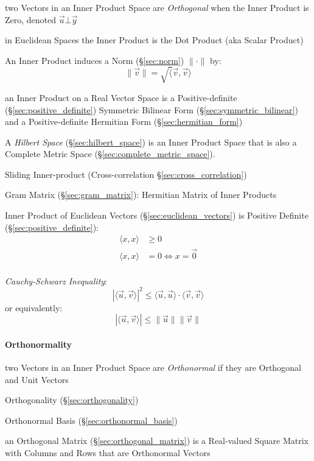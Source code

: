 two Vectors in an Inner Product Space are \emph{Orthogonal} when the Inner
Product is Zero, denoted $\vec{u} \bot \vec{y}$

in Euclidean Spaces the Inner Product is the Dot Product (aka Scalar Product)

An Inner Product induces a Norm (\S\ref{sec:norm}) $\|\cdot\|$ by:
\[
  \|\vec{v}\| = \sqrt\langle{\vec{v},\vec{v}}\rangle
\]

an Inner Product on a Real Vector Space is a Positive-definite
(\S\ref{sec:positive_definite}) Symmetric Bilinear Form
(\S\ref{sec:symmetric_bilinear}) and a Positive-definite Hermitian Form
(\S\ref{sec:hermitian_form})

A \emph{Hilbert Space} (\S\ref{sec:hilbert_space}) is an Inner Product Space
that is also a Complete Metric Space (\S\ref{sec:complete_metric_space}).

\fist Sliding Inner-product (Cross-correlation \S\ref{sec:cross_correlation})

\fist Gram Matrix (\S\ref{sec:gram_matrix}): Hermitian Matrix of Inner
Products

Inner Product of Euclidean Vectors (\S\ref{sec:euclidean_vectors}) is Positive
Definite (\S\ref{sec:positive_definite}):
\begin{align*}
  \langle{x,x}\rangle & \geq 0 \\
  \langle{x,x}\rangle & =    0 \Leftrightarrow x = \vec{0} \\
\end{align*}

\emph{Cauchy-Schwarz Inequality}:
\[
  |\langle{\vec{u},\vec{v}}\rangle|^2 \leq
    \langle{\vec{u},\vec{u}}\rangle \cdot \langle{\vec{v},\vec{v}}\rangle
\]
or equivalently:
\[
  |\langle{\vec{u},\vec{v}}\rangle| \leq \|\vec{u}\| \|\vec{v}\|
\]



\paragraph{Orthonormality}\label{sec:orthonormality}\hfill

two Vectors in an Inner Product Space are \emph{Orthonormal} if they are
Orthogonal and Unit Vectors

\fist Orthogonality (\S\ref{sec:orthogonality})

\fist Orthonormal Basis (\S\ref{sec:orthonormal_basis})

an Orthogonal Matrix (\S\ref{sec:orthogonal_matrix}) is a Real-valued Square
Matrix with Columns and Rows that are Orthonormal Vectors



